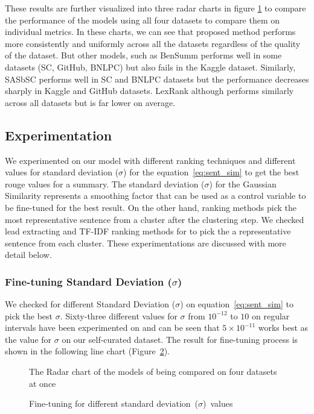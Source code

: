 These results are further visualized into three radar charts in figure \ref{fig:radarchart} to compare the performance of the models using all four datasets to compare them on individual metrics. In these charts, we can see that proposed method performs more consistently and uniformly across all the datasets regardless of the quality of the dataset. But other models, such as BenSumm performs well in some datasets (SC, GitHub, BNLPC) but also fails in the Kaggle dataset. Similarly, SASbSC performs well in SC and BNLPC datasets but the performance decreases sharply in Kaggle and GitHub datasets. LexRank although performs similarly across all datasets but is far lower on average.

\subsection{Experimentation}\label{subsec:experimentation}
We experimented on our model with different ranking techniques and different values for standard deviation ($\sigma$) for the equation~\ref{eq:sent_sim} to get the best rouge values for a summary. The standard deviation ($\sigma$) for the Gaussian Similarity represents a smoothing factor that can be used as a control variable to be fine-tuned for the best result. On the other hand, ranking methods pick the most representative sentence from a cluster after the clustering step. We checked lead extracting and TF-IDF ranking methods for to pick the a representative sentence from each cluster. These experimentations are discussed with more detail below.

\subsubsection{Fine-tuning Standard Deviation ($\sigma$)}\label{subsubsec:sigma}
We checked for different Standard Deviation ($\sigma$) on equation~\ref{eq:sent_sim} to pick the best $\sigma$. Sixty-three different values for $\sigma$ from $10^{-12}$ to $10$ on regular intervals have been experimented on and can be seen that $5\times10^{-11}$ works best as the value for $\sigma$ on our self-curated dataset. The result for fine-tuning process is shown in the following line chart (Figure~\ref{fig:sigma-fine-tuning}).

\begin{figure}[]
    \centering
    
    \caption{The Radar chart of the models of being compared on four datasets at once}
    \label{fig:radarchart}
\end{figure}
\begin{figure}
    \centering
    
    \caption{Fine-tuning for different standard deviation~($\sigma$)~values}
    \label{fig:sigma-fine-tuning}
\end{figure}

